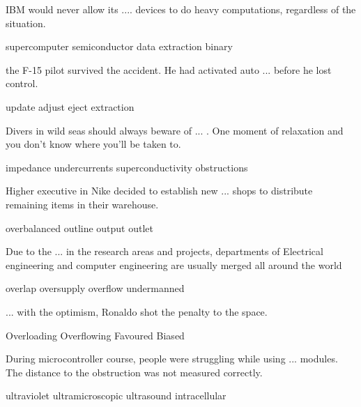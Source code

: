 \documentclass{exam}
\begin{document}
\begin{questions}
\question IBM would never allow its  .... devices to do heavy computations, regardless of the situation.\\
\begin{oneparchoices} 
\correctchoice supercomputer
\choice semiconductor 
\choice data extraction
\choice binary 
\end{oneparchoices}

\question the F-15 pilot survived the accident. He had activated auto ... before he lost control.\\
\begin{oneparchoices}
\choice update
\choice adjust
\correctchoice eject
\choice extraction 
\end{oneparchoices}

\question Divers in wild seas should always beware of ... . One moment of relaxation and you don't know where you'll be taken to.\\
\begin{oneparchoices}
\choice impedance
\correctchoice undercurrents
\choice superconductivity
\choice obstructions 
\end{oneparchoices}

\question Higher executive in Nike decided to establish new ... shops to distribute remaining items in their warehouse.\\
\begin{oneparchoices}
\choice overbalanced
\choice outline
\choice output
\correctchoice outlet
\end{oneparchoices}

\question Due to the ... in the research areas and projects, departments of Electrical engineering and computer engineering are usually merged all around the world
\\
\begin{oneparchoices}
\correctchoice overlap
\choice oversupply
\choice overflow
\choice undermanned
\end{oneparchoices}

\question ... with the optimism, Ronaldo shot the penalty to the  space.\\
\begin{oneparchoices}
\choice Overloading
\correctchoice Overflowing
\choice Favoured
\choice Biased
\end{oneparchoices}

\question During microcontroller course, people were struggling while using ... modules.  The distance to the obstruction was not measured correctly.\\
\begin{oneparchoices}
\choice ultraviolet
\choice ultramicroscopic
\correctchoice ultrasound
\choice intracellular
\end{oneparchoices}


\end{questions}
\end{document}
